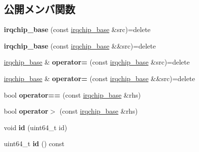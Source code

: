 \subsection*{公開メンバ関数}
\begin{DoxyCompactItemize}
\item 
\hypertarget{classirqchip__base_ab07d75a71ef13af774fd71b176c375e8}{}{\bfseries irqchip\+\_\+base} (const \hyperlink{classirqchip__base}{irqchip\+\_\+base} \&src)=delete\label{classirqchip__base_ab07d75a71ef13af774fd71b176c375e8}

\item 
\hypertarget{classirqchip__base_a903392a762dd05199663effcb6b88512}{}{\bfseries irqchip\+\_\+base} (const \hyperlink{classirqchip__base}{irqchip\+\_\+base} \&\&src)=delete\label{classirqchip__base_a903392a762dd05199663effcb6b88512}

\item 
\hypertarget{classirqchip__base_ae8f56c199cebbea51ec901f316e29670}{}\hyperlink{classirqchip__base}{irqchip\+\_\+base} \& {\bfseries operator=} (const \hyperlink{classirqchip__base}{irqchip\+\_\+base} \&src)=delete\label{classirqchip__base_ae8f56c199cebbea51ec901f316e29670}

\item 
\hypertarget{classirqchip__base_aa16599b249ba6e54427abca666d66c00}{}\hyperlink{classirqchip__base}{irqchip\+\_\+base} \& {\bfseries operator=} (const \hyperlink{classirqchip__base}{irqchip\+\_\+base} \&\&src)=delete\label{classirqchip__base_aa16599b249ba6e54427abca666d66c00}

\item 
\hypertarget{classirqchip__base_a30b803034241c5e00db81157705a28e0}{}bool {\bfseries operator==} (const \hyperlink{classirqchip__base}{irqchip\+\_\+base} \&rhs)\label{classirqchip__base_a30b803034241c5e00db81157705a28e0}

\item 
\hypertarget{classirqchip__base_a07aeae532b54aef12b340ad13fa61efb}{}bool {\bfseries operator$>$} (const \hyperlink{classirqchip__base}{irqchip\+\_\+base} \&rhs)\label{classirqchip__base_a07aeae532b54aef12b340ad13fa61efb}

\item 
\hypertarget{classirqchip__base_add853bf0c0f98ccf5b927daf5cf7dfc9}{}void {\bfseries id} (uint64\+\_\+t id)\label{classirqchip__base_add853bf0c0f98ccf5b927daf5cf7dfc9}

\item 
\hypertarget{classirqchip__base_a11d35ccdb49e1c1dd4abd774a62975d1}{}uint64\+\_\+t {\bfseries id} () const \label{classirqchip__base_a11d35ccdb49e1c1dd4abd774a62975d1}


\end{DoxyCompactItemize}
